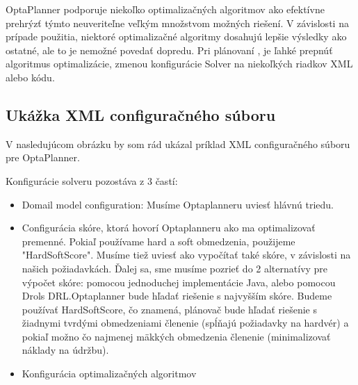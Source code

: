 OptaPlanner podporuje niekoľko optimalizačných algoritmov ako efektívne prehrýzť týmto neuveriteľne veľkým množstvom možných riešení. V závislosti na prípade použitia, niektoré optimalizačné algoritmy dosahujú lepšie výsledky ako ostatné, ale to je nemožné povedať dopredu. Pri plánovaní , je ľahké prepnúť algoritmus optimalizácie, zmenou konfigurácie Solver na niekoľkých riadkov XML alebo kódu.


\newpage
\subsection{Ukážka XML configuračného súboru}
V nasledujúcom obrázku by som rád ukázal príklad XML configuračného súboru pre OptaPlanner.
    

\newpage
Konfigurácie solveru pozostáva z 3 častí: 
\begin{itemize}
\item Domail model configuration: Musíme Optaplanneru uviesť hlávnú triedu.
\item Configurácia skóre, ktorá hovorí Optaplanneru ako ma optimalizovať premenné. Pokiaľ používame hard a soft obmedzenia, použijeme "HardSoftScore". Musíme tiež uviesť ako vypočítať také skóre, v závislosti na našich požiadavkách. Ďalej sa, sme musíme  pozrieť do 2 alternatívy pre výpočet skóre: pomocou jednoduchej implementácie Java, alebo pomocou Drols DRL.Optaplanner bude hľadať riešenie s najvyšším skóre. Budeme používať HardSoftScore, čo znamená, plánovač bude hľadať riešenie s žiadnymi tvrdými obmedzeniami členenie (spĺňajú požiadavky na hardvér) a pokiaľ možno čo najmenej mäkkých obmedzenia členenie (minimalizovať náklady na údržbu).
\item Konfigurácia optimalizačných algoritmov

\end{itemize}

